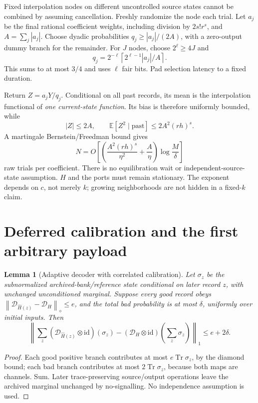 \documentclass[11pt]{article}
\newtheorem{lemma}[theorem]{Lemma}
\newcommand{\id}{\mathrm{id}}
\newcommand{\Tr}{\operatorname{Tr}}
\newcommand{\norm}[1]{\left\lVert #1\right\rVert}
\newcommand{\cD}{\mathcal D}
\begin{document}
Fixed interpolation nodes on different uncontrolled source states cannot
be combined by assuming cancellation. Freshly randomize the node each
trial. Let \(a_j\) be the final rational coefficient weights, including
division by \(2s!r^s\), and \(A=\sum_j|a_j|\). Choose dyadic probabilities
\(q_j\ge|a_j|/(2A)\), with a zero-output dummy branch for the remainder.
For \(J\) nodes, choose \(2^\ell\ge4J\) and
\[
q_j=2^{-\ell}\left\lceil2^{\ell-1}|a_j|/A\right\rceil .
\]
This sums to at most \(3/4\) and uses \(\ell\) fair bits.
Pad selection latency to a fixed duration.

Return \(Z=a_jY/q_j\). Conditional on all past records, its mean is the
interpolation functional of \emph{one current-state function}. Its bias
is therefore uniformly bounded, while
\[
|Z|\le2A,\qquad \mathbb E[Z^2\mid\mathrm{past}]\le2A^2(rh)^s.
\]
A martingale Bernstein/Freedman bound gives
\[
N=O\!\left[\left(\frac{A^2(rh)^s}{\eta^2}+\frac A\eta\right)
\log\frac M\delta\right]
\]
raw trials per coefficient. There is no equilibration wait or
independent-source-state assumption. \(H\) and the ports must remain
stationary. The exponent depends on \(c\), not merely \(k\);
growing neighborhoods are not hidden in a fixed-\(k\) claim.

\section{Deferred calibration and the first arbitrary payload}
\begin{lemma}[Adaptive decoder with correlated calibration]
Let \(\sigma_z\) be the subnormalized archived-bank/reference state conditional
on later record \(z\), with unchanged unconditioned marginal. Suppose every
good record obeys \(\norm{\cD_{\widehat H(z)}-\cD_H}_\diamond\le e\), and
the total bad probability is at most \(\delta\), uniformly over initial inputs.
Then
\[
\norm{\sum_z(\cD_{\widehat H(z)}\otimes\id)(\sigma_z)
-(\cD_H\otimes\id)(\sum_z\sigma_z)}_1\le e+2\delta.
\]
\end{lemma}
\begin{proof}
Each good positive branch contributes at most \(e\Tr\sigma_z\), by the
diamond bound; each bad branch contributes at most \(2\Tr\sigma_z\),
because both maps are channels. Sum. Later trace-preserving source/output
operations leave the archived marginal unchanged by no-signalling.
No independence assumption is used.
\end{proof}
\end{document}
